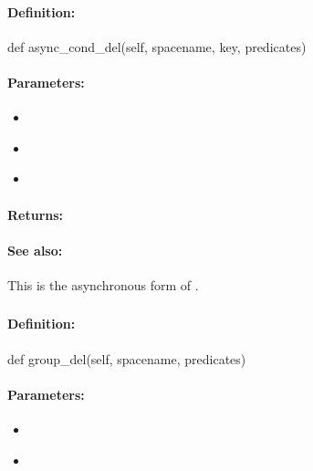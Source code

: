 \paragraph{Definition:}
\begin{pythoncode}
def async_cond_del(self, spacename, key, predicates)
\end{pythoncode}

\paragraph{Parameters:}
\begin{itemize}[noitemsep]
\item {}\\

\item {}\\

\item {}\\

\end{itemize}

\paragraph{Returns:}


\paragraph{See also:}  This is the asynchronous form of .

\pagebreak
\subsubsection{}
\label{api:python:group_del}


\paragraph{Definition:}
\begin{pythoncode}
def group_del(self, spacename, predicates)
\end{pythoncode}

\paragraph{Parameters:}
\begin{itemize}[noitemsep]
\item {}\\

\item {}\\

\end{itemize}

